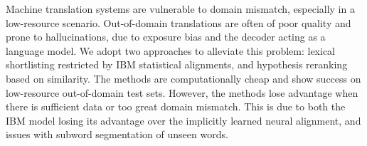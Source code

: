 Machine translation systems are vulnerable to domain mismatch, especially in a low-resource scenario. Out-of-domain translations are often of poor quality and prone to hallucinations, due to exposure bias and the decoder acting as a language model. We adopt two approaches to alleviate this problem: lexical shortlisting restricted by IBM statistical alignments, and hypothesis reranking based on similarity. The methods are computationally cheap and show success on low-resource out-of-domain test sets. However, the methods lose advantage when there is sufficient data or too great domain mismatch. This is due to both the IBM model losing its advantage over the implicitly learned neural alignment, and issues with subword segmentation of unseen words.
